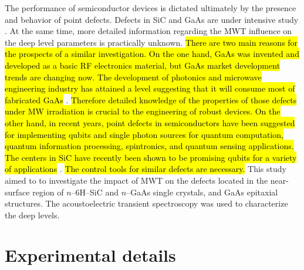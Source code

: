\documentclass[10pt]{iopart}
\begin{document}
The performance of semiconductor devices is dictated
ultimately by the presence and behavior of point defects.
Defects in SiC and GaAs are under intensive study \cite{6HSiC:VV2019,SiCWei,GAPel2020,GASobolev2020}.
At the same time,
more detailed information regarding the MWT influence on the deep level parameters is practically unknown.
\hl{There are two main reasons for the prospects of a similar investigation.
On the one hand, GaAs was invented and developed as a basic RF electronics material, but GaAs market development trends are changing now.
The development of photonics and microwave engineering industry has attained a level suggesting
that it will consume most of fabricated GaAs} \cite{GaAs:Kulch2020}.
\hl{Therefore detailed knowledge of the properties of those defects under MW irradiation
is crucial to the engineering of robust devices.
On the other hand, in recent years, point defects in semiconductors have been suggested for implementing qubits
and single photon sources for quantum computation, quantum information processing, spintronics,
and quantum sensing applications.
The centers in SiC have recently been shown to be promising qubits for a variety of
applications} \cite{6HSiC:VV2019,4HSiC:VV,6HSiC:Singh2021,4HSiC:Vc}.
\hl{The control tools for similar defects are necessary.}
This study aimed to to investigate the impact of MWT on the defects located in the near-surface region
of $n$--6H--SiC and $n$--GaAs single crystals,
and  GaAs  epitaxial structures.
The  acoustoelectric  transient spectroscopy was used to characterize the deep levels.

\section{Experimental details}\label{sec:Exp}
\end{document}
